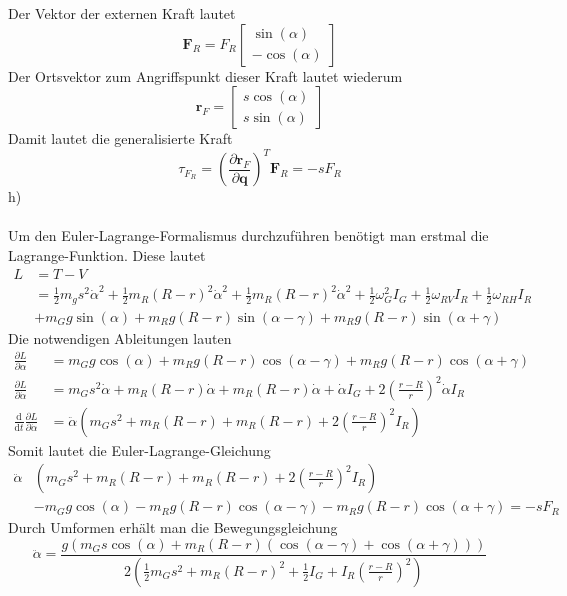 Der Vektor der externen Kraft lautet
\[
	\textbf{F}_R = F_R\begin{bmatrix}
		\sin(\alpha) \\
		-\cos(\alpha)
	\end{bmatrix}
\]
Der Ortsvektor zum Angriffspunkt dieser Kraft lautet wiederum
\[
	\textbf{r}_F = \begin{bmatrix}
		s\cos(\alpha) \\
		s\sin(\alpha)
	\end{bmatrix}
\]
Damit lautet die generalisierte Kraft
\[
	\tau_{F_R} = \left(\frac{\partial \textbf{r}_F}{\partial \textbf{q}}\right)^T\textbf{F}_R = -sF_R
\]
h)\\ \\
Um den Euler-Lagrange-Formalismus durchzuführen benötigt man erstmal die Lagrange-Funktion. Diese lautet
\begin{align*}
	L &= T - V \\
	  &= \frac{1}{2}m_gs^2\dot{\alpha}^2 + \frac{1}{2}m_R(R - r)^2\dot{\alpha}^2 + \frac{1}{2}m_R(R - r)^2\dot{\alpha}^2 + \frac{1}{2}\omega_G^2I_G + \frac{1}{2}\omega_{RV}I_R + \frac{1}{2}\omega_{RH}I_R \\
	  &+ m_Gg\sin(\alpha) + m_Rg(R - r)\sin(\alpha -  \gamma) + m_Rg(R - r)\sin(\alpha +  \gamma)
\end{align*}
Die notwendigen Ableitungen lauten
\begin{align*}
	\frac{\partial L}{\partial \alpha} &= m_Gg\cos(\alpha) + m_Rg(R - r)\cos(\alpha - \gamma) + m_Rg(R - r)\cos(\alpha + \gamma) \\
	\frac{\partial L}{\partial \dot{\alpha}} &= m_Gs^2\dot{\alpha} + m_R(R - r)\dot{\alpha} + m_R(R - r)\dot{\alpha} + \dot{\alpha}I_G  + 2\left(\frac{r - R}{r}\right)^2\dot{\alpha}I_R \\
	\frac{\text{d}}{\text{d}t}\frac{\partial L}{\partial \dot{\alpha}} &= \ddot{\alpha}\left(m_Gs^2 +  m_R(R - r) + m_R(R - r) + 2\left(\frac{r - R}{r}\right)^2I_R\right)
\end{align*}
Somit lautet die Euler-Lagrange-Gleichung
\begin{align*}
	\ddot{\alpha}&\left(m_Gs^2 +  m_R(R - r) + m_R(R - r) + 2\left(\frac{r - R}{r}\right)^2I_R\right) \\
	&-m_Gg\cos(\alpha) - m_Rg(R - r)\cos(\alpha - \gamma) - m_Rg(R - r)\cos(\alpha + \gamma) = -sF_R
\end{align*}
Durch Umformen erhält man die Bewegungsgleichung
\[
	\ddot{\alpha} = \frac{g(m_Gs\cos(\alpha) + m_R(R - r)(\cos(\alpha - \gamma) + \cos(\alpha + \gamma)))}{2\left(\frac{1}{2}m_Gs^2 + m_R(R - r)^2 + \frac{1}{2}I_G + I_R\left(\frac{r - R}{r}\right)^2\right)}
\]